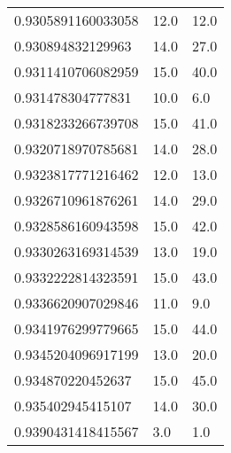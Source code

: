 \begin{center}
\begin{supertabular}[H]{p{0.30\textwidth}p{0.05\textwidth}p{0.05\textwidth}}
0.9305891160033058 & 12.0 & 12.0 \\ 
0.930894832129963 & 14.0 & 27.0 \\ 
0.9311410706082959 & 15.0 & 40.0 \\ 
0.931478304777831 & 10.0 & 6.0 \\ 
0.9318233266739708 & 15.0 & 41.0 \\ 
0.9320718970785681 & 14.0 & 28.0 \\ 
0.9323817771216462 & 12.0 & 13.0 \\ 
0.9326710961876261 & 14.0 & 29.0 \\ 
0.9328586160943598 & 15.0 & 42.0 \\ 
0.9330263169314539 & 13.0 & 19.0 \\ 
0.9332222814323591 & 15.0 & 43.0 \\ 
0.9336620907029846 & 11.0 & 9.0 \\ 
0.9341976299779665 & 15.0 & 44.0 \\ 
0.9345204096917199 & 13.0 & 20.0 \\ 
0.934870220452637 & 15.0 & 45.0 \\ 
0.935402945415107 & 14.0 & 30.0 \\ 
0.9390431418415567 & 3.0 & 1.0 \\ 
\end{supertabular}
\end{center}
